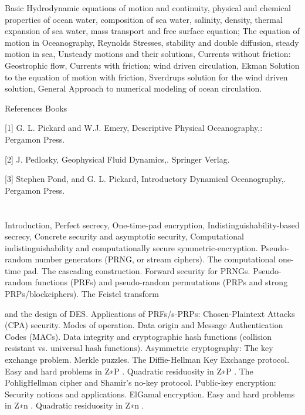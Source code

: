   

Basic Hydrodynamic equations of motion and continuity, physical and chemical properties of ocean water, composition of sea water, salinity, density, thermal expansion of sea water, mass transport and free surface equation; The equation of motion in Oceanography, Reynolds Stresses, stability and double diffusion, steady motion in sea, Unsteady motions and their solutions, Currents without friction: Geostrophic flow, Currents with friction; wind driven circulation, Ekman Solution to the equation of motion with friction, Sverdrups solution for the wind driven solution, General Approach to numerical modeling of ocean circulation. 

 

References Books 

[1] G. L. Pickard and W.J. Emery, Descriptive Physical Oceanography,: Pergamon Press.  

[2] J. Pedlosky, Geophysical Fluid Dynamics,. Springer Verlag. 

[3] Stephen Pond, and G. L. Pickard, Introductory Dynamical Oceanography,. Pergamon Press. 

 
\section{\dsccourseinfo}

 

Introduction, Perfect secrecy, One-time-pad encryption, Indistinguishability-based secrecy, Concrete security and asymptotic security, Computational indistinguishability and computationally secure symmetric-encryption. Pseudo-random number generators (PRNG, or stream ciphers). The computational one-time pad. The cascading construction. Forward security for PRNGs. Pseudo-random functions (PRFs) and pseudo-random permutations (PRPs and strong PRPs/blockciphers). The Feistel transform 

and the design of DES. Applications of PRFs/s-PRPs: Chosen-Plaintext Attacks (CPA) security. Modes of operation. Data origin and Message Authentication Codes (MACs). Data integrity and cryptographic hash functions (collision resistant vs. universal hash functions). Asymmetric cryptography: The key exchange problem. Merkle puzzles. The Diffie-Hellman Key Exchange protocol. Easy and hard problems in 
Z∗P
. Quadratic residuosity in 
Z∗P
. The PohligHellman cipher and Shamir’s no-key protocol. Public-key encryption: Security notions and applications. ElGamal encryption. Easy and hard problems in 
Z∗n
. Quadratic residuosity in 
Z∗n
. 

